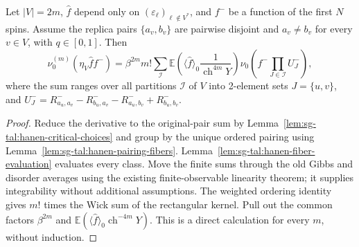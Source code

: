 \begin{theorem}\label{thm:sg-tal:hanen-pairing-derivative}
\leanok
{}
Let $|V| = 2m$, $\hat f$ depend only on $(\varepsilon_\ell)_{\ell \notin V^*}$, and $f^-$ be a function of the first $N$ spins.
Assume the replica pairs $\{a_v,b_v\}$ are pairwise disjoint and $a_v\ne b_v$ for every $v\in V$, with $q\in[0,1]$.
Then
\[
\nu_0^{(m)}(\eta_V \hat f f^-) = \beta^{2m} m! \sum_{\mathcal I} \mathbb E\left( \langle \hat f \rangle_0 \frac{1}{\operatorname{ch}^{4m} Y} \right)
\nu_0\left( f^- \prod_{J \in \mathcal I} U_J^- \right),
\]
where the sum ranges over all partitions $\mathcal I$ of $V$ into 2-element sets $J = \{u, v\}$, and
$U_J^- = R^-_{a_u,a_v} - R^-_{b_u,a_v} - R^-_{a_u,b_v} + R^-_{b_u,b_v}$.
\end{theorem}
\begin{proof}
\leanok
Reduce the derivative to the original-pair sum by
Lemma~\ref{lem:sg-tal:hanen-critical-choices} and group by the unique ordered
pairing using Lemma~\ref{lem:sg-tal:hanen-pairing-fibers}.
Lemma~\ref{lem:sg-tal:hanen-fiber-evaluation} evaluates every class.
Move the finite sums through the old Gibbs and disorder averages using the
existing finite-observable linearity theorem; it supplies integrability
without additional assumptions. The weighted ordering identity gives $m!$
times the Wick sum of the rectangular kernel. Pull out the common factors
$\beta^{2m}$ and $\mathbb E(\langle\hat f\rangle_0\operatorname{ch}^{-4m}Y)$.
This is a direct calculation for every $m$, without induction.
\end{proof}


